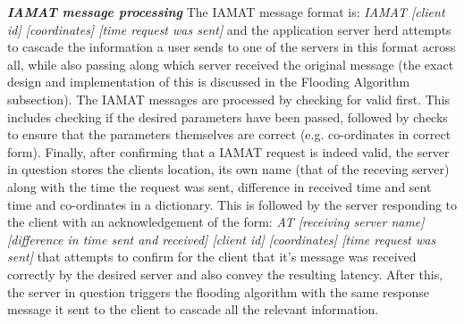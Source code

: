 \noindent\textbf{\emph{IAMAT message processing}}\newline
The IAMAT message format is: \newline \emph{IAMAT [client id] [coordinates] [time request was sent]} \newline and the application server herd attempts to cascade the information a user sends to one of the servers in this format across all, while also passing along which server received the original message (the exact design and implementation of this is discussed in the Flooding Algorithm subsection). The IAMAT messages are processed by checking for valid first. This includes checking if the desired parameters have been passed, followed by checks to ensure that the parameters themselves are correct (e.g. co-ordinates in correct form). Finally, after confirming that a IAMAT request is indeed valid, the server in question stores the clients location, its own name (that of the receving server) along with the time the request was sent, difference in received time and sent time and co-ordinates in a dictionary. This is followed by the server responding to the client with an acknowledgement of the form: \newline
\emph{AT [receiving server name] [difference in time sent and received] [client id] [coordinates] [time request was sent]} that attempts to confirm for the client that it's message was received correctly by the desired server and also convey the resulting latency. After this, the server in question triggers the flooding algorithm with the same response message it sent to the client to cascade all the relevant information. \newline

